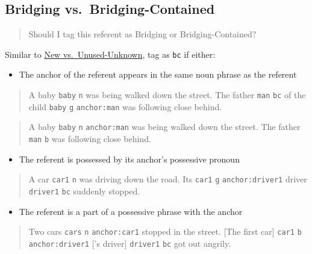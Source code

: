 \documentclass[
]{book}
\providecommand{\tightlist}{%
  \setlength{\itemsep}{0pt}\setlength{\parskip}{0pt}}
\begin{document}
\hypertarget{bridging-vs.-bridging-contained}{%
\subsection{Bridging vs.~Bridging-Contained}\label{bridging-vs.-bridging-contained}}

\begin{quote}
Should I tag this referent as Bridging or Bridging-Contained?
\end{quote}

Similar to \protect\hyperlink{new-vs.-unused-unknown}{New vs.~Unused-Unknown},
tag as \texttt{bc} if either:

\begin{itemize}
\tightlist
\item
  The anchor of the referent appears in the same noun phrase as the referent
\end{itemize}

\begin{quote}
A baby \texttt{baby} \texttt{n} was being walked down the street.
The father \texttt{man} \texttt{bc} of the child \texttt{baby} \texttt{g} \texttt{anchor:man} was following close behind.
\end{quote}

\begin{quote}
A baby \texttt{baby} \texttt{n} \texttt{anchor:man} was being walked down the street.
The father \texttt{man} \texttt{b} was following close behind.
\end{quote}

\begin{itemize}
\tightlist
\item
  The referent is possessed by its anchor's possessive pronoun
\end{itemize}

\begin{quote}
A car \texttt{car1} \texttt{n} was driving down the road.
Its \texttt{car1} \texttt{g} \texttt{anchor:driver1} driver \texttt{driver1} \texttt{bc} suddenly stopped.
\end{quote}

\begin{itemize}
\tightlist
\item
  The referent is a part of a possessive phrase with the anchor
\end{itemize}

\begin{quote}
Two cars \texttt{cars} \texttt{n} \texttt{anchor:car1} stopped in the street.
{[}The first car{]} \texttt{car1} \texttt{b} \texttt{anchor:driver1}
{[}'s driver{]} \texttt{driver1} \texttt{bc} got out angrily.
\end{quote}
\end{document}
